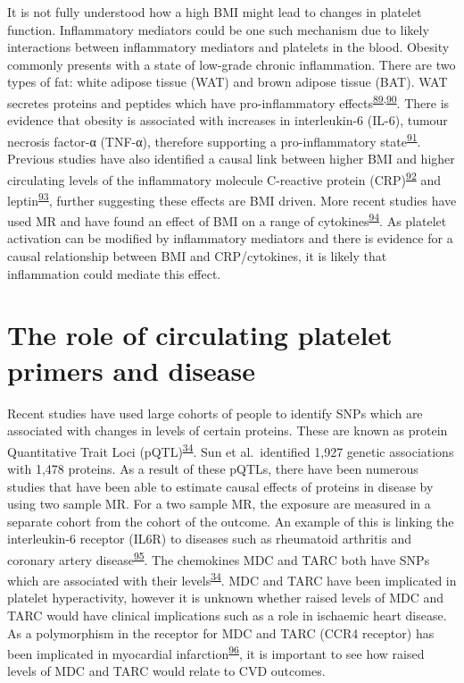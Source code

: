 \documentclass[11pt,twoside]{bristolthesis}
\begin{document}
It is not fully understood how a high BMI might lead to changes in platelet function. Inflammatory mediators could be one such mechanism due to likely interactions between inflammatory mediators and platelets in the blood. Obesity commonly presents with a state of low-grade chronic inflammation. There are two types of fat: white adipose tissue (WAT) and brown adipose tissue (BAT). WAT secretes proteins and peptides which have pro-inflammatory effects\textsuperscript{\protect\hyperlink{ref-Cercato2019}{89},\protect\hyperlink{ref-Kern2001}{90}}. There is evidence that obesity is associated with increases in interleukin-6 (IL-6), tumour necrosis factor-α (TNF-α), therefore supporting a pro-inflammatory state\textsuperscript{\protect\hyperlink{ref-Esser2014}{91}}. Previous studies have also identified a causal link between higher BMI and higher circulating levels of the inflammatory molecule C-reactive protein (CRP)\textsuperscript{\protect\hyperlink{ref-Timpson2011}{92}} and leptin\textsuperscript{\protect\hyperlink{ref-Zaghlool2021}{93}}, further suggesting these effects are BMI driven. More recent studies have used MR and have found an effect of BMI on a range of cytokines\textsuperscript{\protect\hyperlink{ref-Kalaoja2021}{94}}. As platelet activation can be modified by inflammatory mediators and there is evidence for a causal relationship between BMI and CRP/cytokines, it is likely that inflammation could mediate this effect.

\hypertarget{the-role-of-circulating-platelet-primers-and-disease}{%
\section{The role of circulating platelet primers and disease}\label{the-role-of-circulating-platelet-primers-and-disease}}

Recent studies have used large cohorts of people to identify SNPs which are associated with changes in levels of certain proteins. These are known as protein Quantitative Trait Loci (pQTL)\textsuperscript{\protect\hyperlink{ref-Sun2018}{34}}. Sun et al.~identified 1,927 genetic associations with 1,478 proteins. As a result of these pQTLs, there have been numerous studies that have been able to estimate causal effects of proteins in disease by using two sample MR. For a two sample MR, the exposure are measured in a separate cohort from the cohort of the outcome. An example of this is linking the interleukin-6 receptor (IL6R) to diseases such as rheumatoid arthritis and coronary artery disease\textsuperscript{\protect\hyperlink{ref-Bretherick2020}{95}}. The chemokines MDC and TARC both have SNPs which are associated with their levels\textsuperscript{\protect\hyperlink{ref-Sun2018}{34}}. MDC and TARC have been implicated in platelet hyperactivity, however it is unknown whether raised levels of MDC and TARC would have clinical implications such as a role in ischaemic heart disease. As a polymorphism in the receptor for MDC and TARC (CCR4 receptor) has been implicated in myocardial infarction\textsuperscript{\protect\hyperlink{ref-Noori2018}{96}}, it is important to see how raised levels of MDC and TARC would relate to CVD outcomes.
\end{document}
